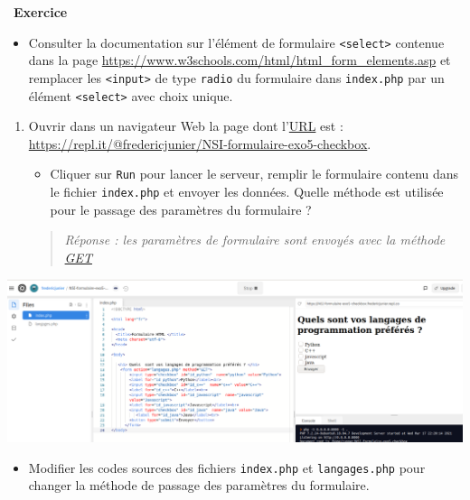 \documentclass[
  11pt,
]{article}
\newcommand{\passthrough}[1]{#1}
\providecommand{\tightlist}{%
  \setlength{\itemsep}{0pt}\setlength{\parskip}{0pt}}
\newcounter{exo}
\newenvironment{exercice}[1]
{\par \medskip   \addtocounter{exo}{1} \noindent  
\begin{bclogo}[arrondi =0.1,   noborder = true, logo=\bccrayon, marge=4]{~\textbf{Exercice} \textbf{\theexo} {\itshape #1} }  \par}
{
\end{bclogo}
 \par \bigskip }
\newcounter{def}
\begin{document}
\begin{exercice}{}
\begin{itemize}
\tightlist
\item
  Consulter la documentation sur l'élément de formulaire
  \passthrough{\lstinline!<select>!} contenue dans la page
  \url{https://www.w3schools.com/html/html_form_elements.asp} et
  remplacer les \passthrough{\lstinline!<input>!} de type
  \passthrough{\lstinline!radio!} du formulaire dans
  \passthrough{\lstinline!index.php!} par un élément
  \passthrough{\lstinline!<select>!} avec choix unique.
\end{itemize}

\begin{enumerate}
\def\labelenumi{\arabic{enumi}.}
\setcounter{enumi}{1}
\tightlist
\item
  Ouvrir dans un navigateur Web la page dont
  l'\href{https://developer.mozilla.org/fr/docs/Glossaire/URL}{URL} est
  :\\
  \url{https://repl.it/@fredericjunier/NSI-formulaire-exo5-checkbox}.

  \begin{itemize}
  \tightlist
  \item
    Cliquer sur \passthrough{\lstinline!Run!} pour lancer le serveur,
    remplir le formulaire contenu dans le fichier
    \passthrough{\lstinline!index.php!} et envoyer les données. Quelle
    méthode est utilisée pour le passage des paramètres du formulaire ?
  \end{itemize}

  \begin{quote}
  \emph{Réponse : les paramètres de formulaire sont envoyés avec la
  méthode \url{GET}}
  \end{quote}
\end{enumerate}

\includegraphics{images/formulaire_replit_checkbox.png}\\

\begin{itemize}
\tightlist
\item
  Modifier les codes sources des fichiers
  \passthrough{\lstinline!index.php!} et
  \passthrough{\lstinline!langages.php!} pour changer la méthode de
  passage des paramètres du formulaire.
\end{itemize}


\end{exercice}
\end{document}
